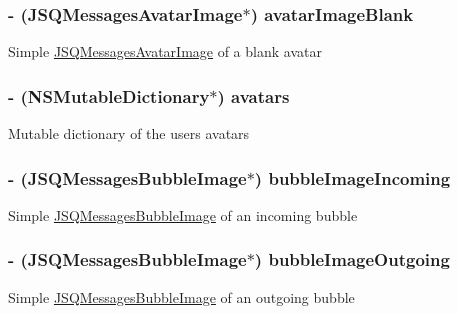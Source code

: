 \subsubsection[{avatar\+Image\+Blank}]{\setlength{\rightskip}{0pt plus 5cm}-\/ ({\bf J\+S\+Q\+Messages\+Avatar\+Image}$\ast$) avatar\+Image\+Blank\hspace{0.3cm}{\ttfamily [protected]}}\label{category_e_s_chat_view_07_08_a4964fae6aa4ca1b993424aa349b6efc4}
Simple \hyperlink{interface_j_s_q_messages_avatar_image}{J\+S\+Q\+Messages\+Avatar\+Image} of a blank avatar \hypertarget{category_e_s_chat_view_07_08_a6f9e3c3ad749bcf46e9bc0431294626e}{}
\subsubsection[{avatars}]{\setlength{\rightskip}{0pt plus 5cm}-\/ (N\+S\+Mutable\+Dictionary$\ast$) avatars\hspace{0.3cm}{\ttfamily [protected]}}\label{category_e_s_chat_view_07_08_a6f9e3c3ad749bcf46e9bc0431294626e}
Mutable dictionary of the user\textquotesingle{}s avatars \hypertarget{category_e_s_chat_view_07_08_a57710c9690a5c30d8eaeba1cc1bc0945}{}
\subsubsection[{bubble\+Image\+Incoming}]{\setlength{\rightskip}{0pt plus 5cm}-\/ ({\bf J\+S\+Q\+Messages\+Bubble\+Image}$\ast$) bubble\+Image\+Incoming\hspace{0.3cm}{\ttfamily [protected]}}\label{category_e_s_chat_view_07_08_a57710c9690a5c30d8eaeba1cc1bc0945}
Simple \hyperlink{interface_j_s_q_messages_bubble_image}{J\+S\+Q\+Messages\+Bubble\+Image} of an incoming bubble \hypertarget{category_e_s_chat_view_07_08_aa43723a95f43553e6d1fa6667a3ddb12}{}
\subsubsection[{bubble\+Image\+Outgoing}]{\setlength{\rightskip}{0pt plus 5cm}-\/ ({\bf J\+S\+Q\+Messages\+Bubble\+Image}$\ast$) bubble\+Image\+Outgoing\hspace{0.3cm}{\ttfamily [protected]}}\label{category_e_s_chat_view_07_08_aa43723a95f43553e6d1fa6667a3ddb12}
Simple \hyperlink{interface_j_s_q_messages_bubble_image}{J\+S\+Q\+Messages\+Bubble\+Image} of an outgoing bubble \hypertarget{category_e_s_chat_view_07_08_a360719a0fafbeb2f8d397412b111eba1}{}
